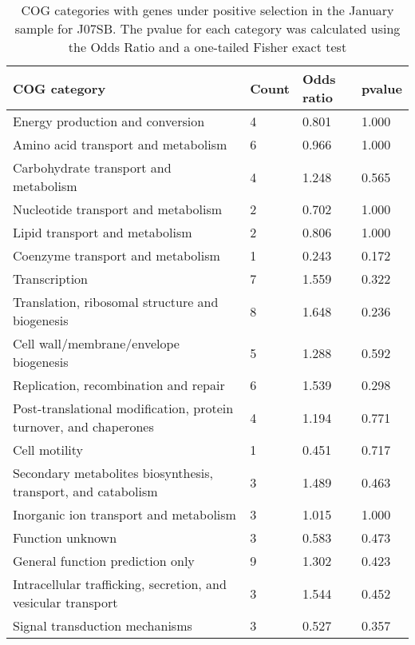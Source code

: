 \begin{table}[]
\footnotesize 
	\tabcolsep=0.11cm 
\caption{COG categories with genes under positive selection in the January sample for J07SB. The pvalue for each category was calculated using the Odds Ratio and a one-tailed Fisher exact test \\} 
\begin{tabularx}{\textwidth}{L{6cm}R{2cm}R{2cm}R{2cm}} 
\hline 
\textbf{COG category} & \textbf{Count} & \textbf{Odds ratio} & \textbf{pvalue} \\ 
\hline 
Energy production and conversion & 4 & 0.801 & 1.000 \\ 
Amino acid transport and metabolism & 6 & 0.966 & 1.000 \\ 
Carbohydrate transport and metabolism & 4 & 1.248 & 0.565 \\ 
Nucleotide transport and metabolism & 2 & 0.702 & 1.000 \\ 
Lipid transport and metabolism & 2 & 0.806 & 1.000 \\ 
Coenzyme transport and metabolism & 1 & 0.243 & 0.172 \\ 
Transcription & 7 & 1.559 & 0.322 \\ 
Translation, ribosomal structure and biogenesis & 8 & 1.648 & 0.236 \\ 
Cell wall/membrane/envelope biogenesis & 5 & 1.288 & 0.592 \\ 
Replication, recombination and repair & 6 & 1.539 & 0.298 \\ 
Post-translational modification, protein turnover, and chaperones & 4 & 1.194 & 0.771 \\ 
Cell motility & 1 & 0.451 & 0.717 \\ 
Secondary metabolites biosynthesis, transport, and catabolism & 3 & 1.489 & 0.463 \\ 
Inorganic ion transport and metabolism & 3 & 1.015 & 1.000 \\ 
Function unknown & 3 & 0.583 & 0.473 \\ 
General function prediction only & 9 & 1.302 & 0.423 \\ 
Intracellular trafficking, secretion, and vesicular transport & 3 & 1.544 & 0.452 \\ 
Signal transduction mechanisms & 3 & 0.527 & 0.357 \\ 
\end{tabularx} 
\label{January_COG_Selection_J07SB} 
 \end{table} 

